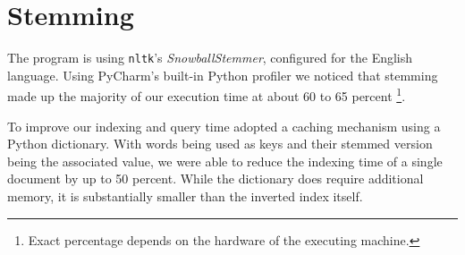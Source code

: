 \section{Stemming}
\label{sec:stemming}

The program is using \verb|nltk|'s \textit{SnowballStemmer}, configured for the English language.
Using PyCharm's built-in Python profiler we noticed that stemming made up the majority of our execution time at about 60 to 65 percent \footnote{Exact percentage depends on the hardware of the executing machine.}.

To improve our indexing and query time adopted a caching mechanism using a Python dictionary.
With words being used as keys and their stemmed version being the associated value, we were able to reduce the indexing time of a single document by up to 50 percent.
While the dictionary does require additional memory, it is substantially smaller than the inverted index itself.
